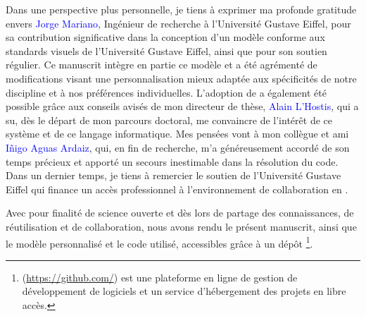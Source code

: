 Dans une perspective plus personnelle, je tiens à exprimer ma profonde gratitude envers \textcolor{blue}{Jorge Mariano}, Ingénieur de recherche à l'Université Gustave Eiffel, pour sa contribution significative dans la conception d'un modèle \latexword{\LaTeX} conforme aux standards visuels de l'Université Gustave Eiffel, ainsi que pour son soutien régulier. Ce manuscrit intègre en partie ce modèle et a été agrémenté de modifications visant une personnalisation mieux adaptée aux spécificités de notre discipline et à nos préférences individuelles. L'adoption de \latexword{\LaTeX} a également été possible grâce aux conseils avisés de mon directeur de thèse, \textcolor{blue}{Alain L'Hostis}, qui a su, dès le départ de mon parcours doctoral, me convaincre de l'intérêt de ce système et de ce langage informatique. Mes pensées vont à mon collègue et ami \textcolor{blue}{Iñigo Aguas Ardaiz}, qui, en fin de recherche, m'a généreusement accordé de son temps précieux et apporté un secours inestimable dans la résolution du code. Dans un dernier temps, je tiens à remercier le soutien de l'Université Gustave Eiffel qui finance un accès professionnel à l'environnement de collaboration en \latexword{\LaTeX} .%

Avec pour finalité de science ouverte et dès lors de partage des connaissances, de réutilisation et de collaboration, nous avons rendu le présent manuscrit, ainsi que le modèle personnalisé et le code utilisé, accessibles grâce à un dépôt \footnote{
     (\url{https://github.com/}) est une plateforme en ligne de gestion de développement de logiciels et un service d'hébergement des projets en libre accès.
}.%

    \bigskip
    \begin{tcolorbox}[colback=white!5!white,
                      colframe=blue!75!blue,
                      title=
                      \bigskip
                      \center{Dépôt \Marque{GitHub}}
                      \bigskip]
    \end{tcolorbox}